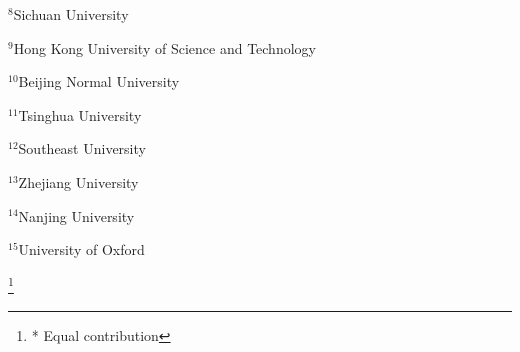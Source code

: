 \begin{flushleft}
$^{8}$Sichuan University

$^{9}$Hong Kong University of Science and Technology

$^{10}$Beijing Normal University

$^{11}$Tsinghua University

$^{12}$Southeast University

$^{13}$Zhejiang University

$^{14}$Nanjing University

$^{15}$University of Oxford

\begingroup
\renewcommand\thefootnote{}
\footnote{* Equal contribution}
\endgroup

\end{flushleft}
